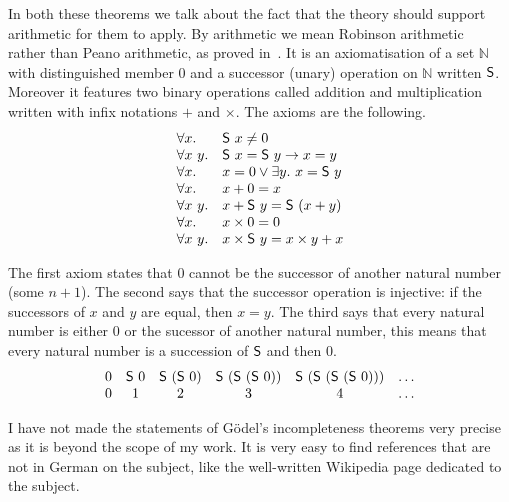 In both these theorems we talk about the fact that the theory should support
arithmetic for them to apply. By arithmetic we mean Robinson
arithmetic~ rather than Peano arithmetic,
as proved in~.
It is an axiomatisation of a set \(\mathbb{N}\) with distinguished member
\(0\) and a successor (unary) operation on \(\mathbb{N}\) written \(\mathsf{S}\).
Moreover it features two binary operations called addition and multiplication
written with infix notations \(+\) and \(\times\).
The axioms are the following.
\[
  \begin{array}{ll}
    \forall x.& \mathsf{S}\ x \not= 0 \\
    \forall x\ y.& \mathsf{S}\ x = \mathsf{S}\ y \to x = y \\
    \forall x.& x = 0 \vee \exists y.\ x = \mathsf{S}\ y \\
    \forall x.& x + 0 = x \\
    \forall x\ y.& x + \mathsf{S}\ y = \mathsf{S}\ (x + y) \\
    \forall x.& x \times 0 = 0 \\
    \forall x\ y.& x \times \mathsf{S}\ y = x \times y + x
  \end{array}
\]

The first axiom states that \(0\) cannot be the successor of another natural
number (\ie some \(n + 1\)). The second says that the successor operation is
injective: if the successors of \(x\) and \(y\) are equal, then \(x = y\).
The third says that every natural number is either \(0\) or the sucessor of
another natural number, this means that every natural number is a succession of
\(\mathsf{S}\) and then \(0\).
\[
  \begin{array}{cccccc}
    0 & \mathsf{S}\ 0 & \mathsf{S}\ (\mathsf{S}\ 0) & \mathsf{S}\ (\mathsf{S}\ (\mathsf{S}\ 0))
    & \mathsf{S}\ (\mathsf{S}\ (\mathsf{S}\ (\mathsf{S}\ 0)))
    & \dots \\
    0 & 1 & 2 & 3 & 4 & \dots
  \end{array}
\]

I have not made the statements of Gödel's incompleteness theorems very precise
as it is beyond the scope of my work. It is very easy to find references that
are not in German on the subject, like the well-written Wikipedia page dedicated
to the subject.

